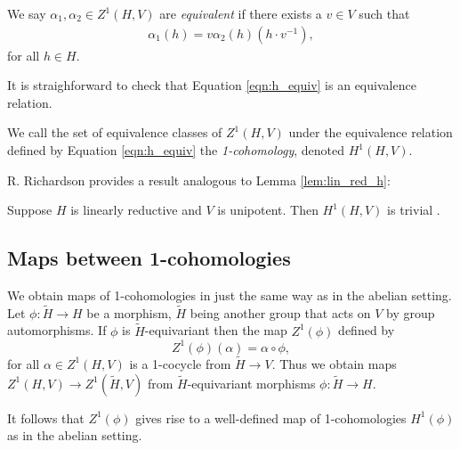 We say $\alpha_1, \alpha_2 \in Z^1(H, V)$ are \emph{equivalent} if there exists a $v \in V$ such that
\begin{eqnarray}
  \alpha_1(h) = v \alpha_2(h) (h \cdot v^{-1}),
  \label{eqn:h_equiv}
\end{eqnarray}
for all $h \in H$.

It is straighforward to check that Equation \ref{eqn:h_equiv} is an equivalence relation.

We call the set of equivalence classes of $Z^1(H, V)$ under the equivalence relation defined by Equation \ref{eqn:h_equiv} the \emph{1-cohomology}, denoted $H^1(H, V)$.

R. Richardson provides a result analogous to Lemma \ref{lem:lin_red_h}:
\begin{lemma}
  Suppose $H$ is linearly reductive and $V$ is unipotent. Then $H^1(H, V)$ is trivial \cite[Lemma 6.2.6]{richardson1982orbits}.
  \label{lem:nonab_lin_red}
\end{lemma}

\subsection{Maps between 1-cohomologies}

We obtain maps of 1-cohomologies in just the same way as in the abelian setting. Let $\phi: \tilde{H} \rightarrow H$ be a morphism, $\tilde{H}$ being another group that acts on $V$ by group automorphisms. If $\phi$ is $\tilde{H}$-equivariant then the map $Z^1(\phi)$ defined by
\begin{displaymath}
  Z^1(\phi)(\alpha) = \alpha \circ \phi,
\end{displaymath}
for all $\alpha \in Z^1(H, V)$ is a 1-cocycle from $\tilde{H} \rightarrow V$. Thus we obtain maps $Z^1(H, V) \rightarrow Z^1(\tilde{H}, V)$ from $\tilde{H}$-equivariant morphisms $\phi: \tilde{H} \rightarrow H$.

It follows that $Z^1(\phi)$ gives rise to a well-defined map of 1-cohomologies $H^1(\phi)$ as in the abelian setting.

